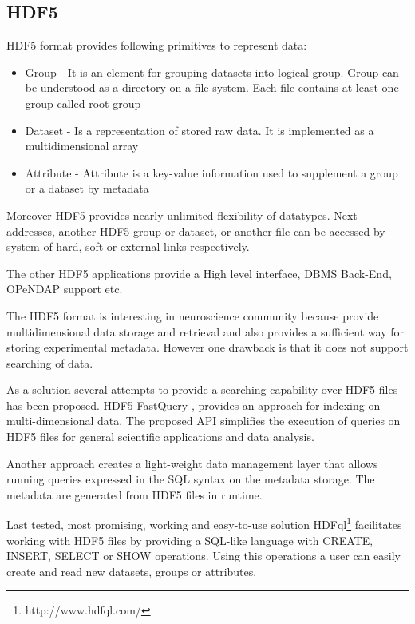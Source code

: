 \documentclass[utf8]{frontiersSCNS} %
\begin{document}
\subsection{HDF5}
\label{HDF5}

HDF5 format \citep{Koziol2011} provides following primitives to represent data:

\begin{itemize}
 \item Group - It is an element for grouping datasets into logical group. Group can be understood as a directory on a file system. Each file contains at least one group called root group
 \item Dataset - Is a representation of stored raw data. It is implemented as a multidimensional array 
 \item Attribute - Attribute is a key-value information used to supplement a group or a dataset by metadata
\end{itemize}

Moreover HDF5 provides nearly unlimited flexibility of datatypes. Next addresses, another HDF5 group or dataset, or another file can be accessed by system of hard, soft or external links respectively.

The other HDF5 applications \citep{Folk:2011:OHT:1966895.1966900} provide a High level interface, DBMS Back-End, OPeNDAP support etc.

The HDF5 format is interesting in neuroscience community because provide multidimensional data storage and retrieval and also provides a sufficient way for storing experimental metadata. However one drawback is that it does not support searching of data.



As a solution several attempts to provide a searching capability over HDF5 files has been proposed. HDF5-FastQuery \citep{1644309}, \citep{6114446} provides an approach for indexing on multi-dimensional data. The proposed API simplifies the execution of queries on HDF5 files for general scientific applications and data analysis.

Another approach \citep{6546110} creates a light-weight data management layer that allows running queries expressed in the SQL syntax on the metadata storage. The metadata are generated from HDF5 files in runtime.

Last tested, most promising, working and easy-to-use solution HDFql\footnote{http://www.hdfql.com/} facilitates working with HDF5 files by providing a SQL-like language with CREATE, INSERT, SELECT or SHOW operations. Using this operations a user can easily create and read new datasets, groups or attributes. 
\end{document}
